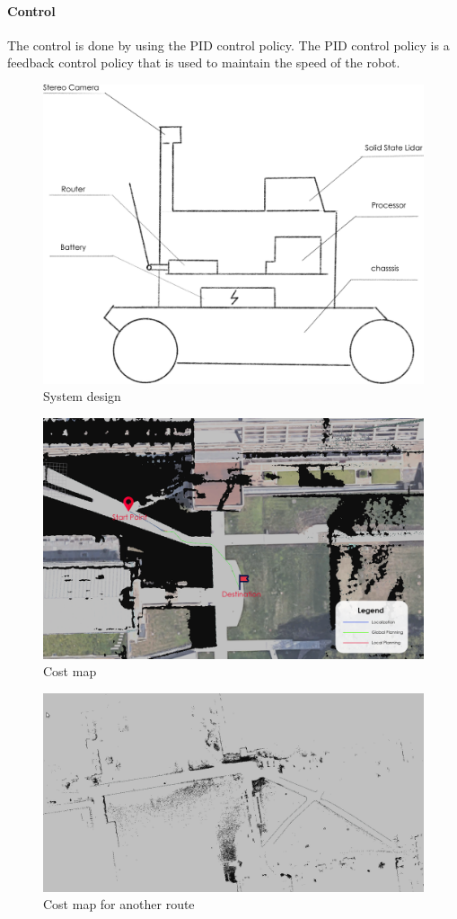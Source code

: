 \documentclass[balance,upint,subscriptcorrection,varvw,nofoot, mathalfa=cal=boondoxo,spanish,french,vietnamese,russian,greek,pdf-a,fontspec,colorlinks]{asmeconf}
\begin{document}
\paragraph{Control} The control is done by using the PID control policy. The PID control policy is a feedback control policy that is used to maintain the speed of the robot.


\begin{figure}
\centering\includegraphics[width=0.7\linewidth]{system.png}
\caption{System design}\label{sys}
\end{figure}

\begin{figure}
\centering\includegraphics[width=0.7\linewidth]{Planning_psed.png}
\caption{Cost map}\label{path_plan}
\end{figure}

\begin{figure}
	\centering\includegraphics[width=0.7\linewidth]{Hunts_UC_2D.png}
	\caption{Cost map for another route}\label{path_plan2}
	\end{figure}
 
\end{document}
